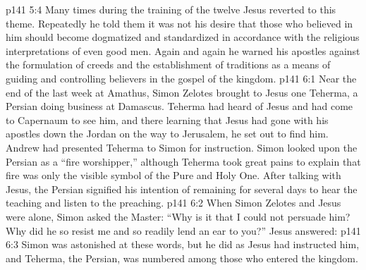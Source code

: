 \vs p141 5:4 Many times during the training of the twelve Jesus reverted to this theme. Repeatedly he told them it was not his desire that those who believed in him should become dogmatized and standardized in accordance with the religious interpretations of even good men. Again and again he warned his apostles against the formulation of creeds and the establishment of traditions as a means of guiding and controlling believers in the gospel of the kingdom.
\vs p141 6:1 Near the end of the last week at Amathus, Simon Zelotes brought to Jesus one Teherma, a Persian doing business at Damascus. Teherma had heard of Jesus and had come to Capernaum to see him, and there learning that Jesus had gone with his apostles down the Jordan on the way to Jerusalem, he set out to find him. Andrew had presented Teherma to Simon for instruction. Simon looked upon the Persian as a “fire worshipper,” although Teherma took great pains to explain that fire was only the visible symbol of the Pure and Holy One. After talking with Jesus, the Persian signified his intention of remaining for several days to hear the teaching and listen to the preaching.
\vs p141 6:2 When Simon Zelotes and Jesus were alone, Simon asked the Master: “Why is it that I could not persuade him? Why did he so resist me and so readily lend an ear to you?” Jesus answered: 
\vs p141 6:3 Simon was astonished at these words, but he did as Jesus had instructed him, and Teherma, the Persian, was numbered among those who entered the kingdom.
